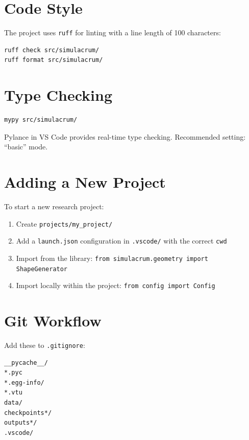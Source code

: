 \documentclass[11pt,a4paper]{report}
\begin{document}
\section{Code Style}

The project uses \texttt{ruff} for linting with a line length of 100 characters:

\begin{lstlisting}[style=bash]
ruff check src/simulacrum/
ruff format src/simulacrum/
\end{lstlisting}

\section{Type Checking}

\begin{lstlisting}[style=bash]
mypy src/simulacrum/
\end{lstlisting}

Pylance in VS Code provides real-time type checking. Recommended setting: ``basic'' mode.

\section{Adding a New Project}

To start a new research project:

\begin{enumerate}[leftmargin=2em]
    \item Create \texttt{projects/my\_project/}
    \item Add a \texttt{launch.json} configuration in \texttt{.vscode/} with the correct \texttt{cwd}
    \item Import from the library: \texttt{from simulacrum.geometry import ShapeGenerator}
    \item Import locally within the project: \texttt{from config import Config}
\end{enumerate}

\section{Git Workflow}

Add these to \texttt{.gitignore}:

\begin{lstlisting}[style=bash,numbers=none]
__pycache__/
*.pyc
*.egg-info/
*.vtu
data/
checkpoints*/
outputs*/
.vscode/
\end{lstlisting}
\end{document}
